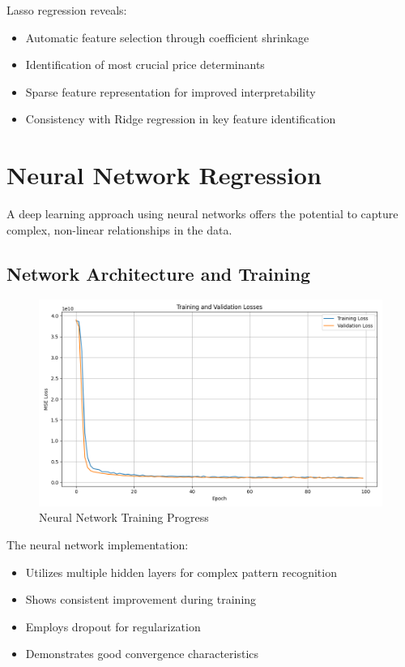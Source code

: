 Lasso regression reveals:
\begin{itemize}
    \item Automatic feature selection through coefficient shrinkage
    \item Identification of most crucial price determinants
    \item Sparse feature representation for improved interpretability
    \item Consistency with Ridge regression in key feature identification
\end{itemize}

\section{Neural Network Regression}
A deep learning approach using neural networks offers the potential to capture complex, non-linear relationships in the data.

\subsection{Network Architecture and Training}
\begin{figure}[H]
    \centering
    \includegraphics[width=1.0\textwidth]{../neural_network_training.png}
    \caption{Neural Network Training Progress}
    \label{fig:nn_training}
\end{figure}

The neural network implementation:
\begin{itemize}
    \item Utilizes multiple hidden layers for complex pattern recognition
    \item Shows consistent improvement during training
    \item Employs dropout for regularization
    \item Demonstrates good convergence characteristics
\end{itemize}

